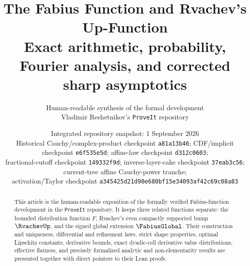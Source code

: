 \documentclass[11pt,oneside]{article}
\title{\bfseries The Fabius Function and Rvachev's Up-Function\\[0.35em]
\large Exact arithmetic, probability, Fourier analysis, and corrected sharp asymptotics}
\author{Human-readable synthesis of the formal development\\
\small Vladimir Reshetnikov's \texttt{ProveIt} repository}
\date{Integrated repository snapshot: 1 September 2026\\
\small Historical Cauchy/complex-product checkpoint \nolinkurl{a81a13b46};
CDF/implicit checkpoint \nolinkurl{e6f535e5d};
affine-law checkpoint \nolinkurl{d312c0603};\\
\small fractional-cutoff checkpoint \nolinkurl{149332f9d};
inverse-layer-cake checkpoint \nolinkurl{37eab3c56};
current-tree affine Cauchy-power tranche;\\
\small activation/Taylor checkpoint
\nolinkurl{a345425d21d90e680bf15e34093af42c69c08a83}}
\theoremstyle{definition}
\theoremstyle{remark}
\begin{document}
\maketitle

\begin{abstract}
This article is the human-readable exposition of the formally verified Fabius-function
development in the \texttt{ProveIt} repository.  It keeps three related functions separate:
the bounded distribution function $F$, Rvachev's even compactly supported bump $\RvachevUp$, and
the signed global extension $\FabiusGlobal$.  Their construction and uniqueness, differential
and refinement laws, strict shape properties, optimal Lipschitz constants, derivative
bounds, exact dyadic-cell derivative value distributions, effective flatness, and precisely
formalized analytic and non-elementarity results are presented together with direct pointers
to their Lean proofs.


\end{abstract}
\end{document}
